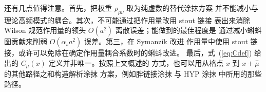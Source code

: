 还有几点值得注意。首先，把权重 $\rho_{\mu\nu}$ 取为纯虚数的替代涂抹方案
并不能减小与理论高频模式的耦合。其次，不可能通过把作用量改用 stout 链接
表出来消除 Wilson 规范作用量的领头 $O(a^2)$ 离散误差；能做到的最佳程度是
通过减小蝌蚪图贡献来削弱 $O(\alpha_s a^2)$ 误差。第三，在 Symanzik 改进
作用量中使用 stout 链接，或许可以免除在确定作用量耦合系数时的蝌蚪改进。
最后，式~(\ref{eq:Cdef}) 给出的 $C_\mu(x)$ 定义并非唯一。按照上文概述的
方式，也可以用从格点 $x$ 到 $x\!+\!\hat{\mu}$ 的其他路径之和构造解析涂抹
方案，例如胖链接涂抹\cite{fat1} 与 HYP 涂抹\cite{hyp} 中所用的那些路径。
